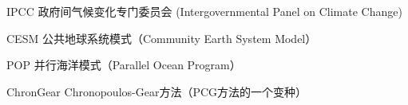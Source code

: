\begin{denotation}[3cm]
\item[IPCC] 政府间气候变化专门委员会 (Intergovernmental Panel on Climate Change)
\item[CESM]  公共地球系统模式（Community Earth System Model）
\item[POP]  并行海洋模式（Parallel Ocean Program）
\item[ChronGear] Chronopoulos-Gear方法（PCG方法的一个变种）
\end{denotation}
